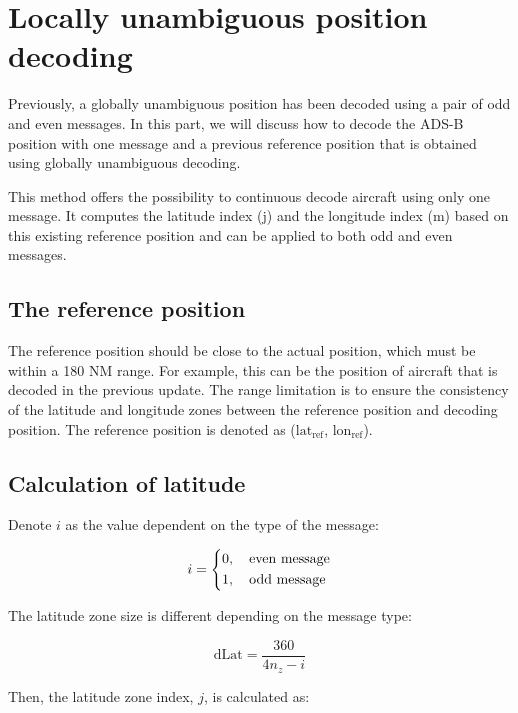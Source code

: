 \section{Locally unambiguous position decoding}

Previously, a globally unambiguous position has been decoded using a pair of odd and even messages. In this part, we will discuss how to decode the ADS-B position with one message and a previous reference position that is obtained using globally unambiguous decoding.

This method offers the possibility to continuous decode aircraft using only one message. It computes the latitude index (j) and the longitude index (m) based on this existing reference position and can be applied to both odd and even messages.

\subsection{The reference position}

The reference position should be close to the actual position, which must be within a 180 NM range. For example, this can be the position of aircraft that is decoded in the previous update. The range limitation is to ensure the consistency of the latitude and longitude zones between the reference position and decoding position. The reference position is denoted as ($\mathrm{lat}_\mathrm{ref}$, $\mathrm{lon}_\mathrm{ref}$).

\subsection{Calculation of latitude}

Denote $i$ as the value dependent on the type of the message:

\begin{equation}
  i =
  \begin{dcases}
    0, \quad \text{even message} \\
    1, \quad \text{odd message}
  \end{dcases}
\end{equation}

\noindent The latitude zone size is different depending on the message type:

\begin{equation}
  \mathrm{dLat} = \frac{360}{4n_z-i}
\end{equation}

Then, the latitude zone index, $j$, is calculated as:


